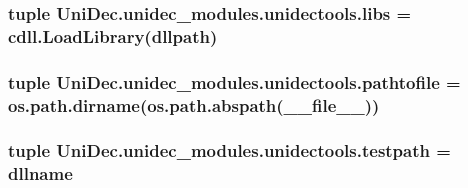 \subsubsection[{libs}]{\setlength{\rightskip}{0pt plus 5cm}tuple Uni\+Dec.\+unidec\+\_\+modules.\+unidectools.\+libs = cdll.\+Load\+Library({\bf dllpath})}\label{namespace_uni_dec_1_1unidec__modules_1_1unidectools_ad22807c824de9a59ef9fe437ea81bbe5}
\hypertarget{namespace_uni_dec_1_1unidec__modules_1_1unidectools_a9a79928662ea12905691072a1c712414}{}
\subsubsection[{pathtofile}]{\setlength{\rightskip}{0pt plus 5cm}tuple Uni\+Dec.\+unidec\+\_\+modules.\+unidectools.\+pathtofile = os.\+path.\+dirname(os.\+path.\+abspath(\+\_\+\+\_\+file\+\_\+\+\_\+))}\label{namespace_uni_dec_1_1unidec__modules_1_1unidectools_a9a79928662ea12905691072a1c712414}
\hypertarget{namespace_uni_dec_1_1unidec__modules_1_1unidectools_a40483a241ff502b9ffa3ad3ae0b4d0d2}{}
\subsubsection[{testpath}]{\setlength{\rightskip}{0pt plus 5cm}tuple Uni\+Dec.\+unidec\+\_\+modules.\+unidectools.\+testpath = {\bf dllname}}\label{namespace_uni_dec_1_1unidec__modules_1_1unidectools_a40483a241ff502b9ffa3ad3ae0b4d0d2}
